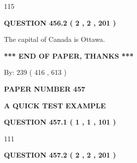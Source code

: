 \documentclass[12pt]{article}
\begin{document}
115
 
 
  
\vspace{0.2in}
  
{\textbf{\Large{QUESTION
456.2 
 ( 2 , 2 , 201 )
}}}
  
  
 
 
\noindent{}
 
 
The capital of Canada is Ottawa.
 
 
 
 
   
   
 \vspace{0.2in}
 
   
   
   
   
\vspace{1.0in} 
{\textbf{\large{ *** END OF PAPER, THANKS *** }}} 
   
   
\hspace{1.0in} By: 
 239 ( 416 ,  613 )
   
   
   
   
\newpage 
\setcounter{page}{ 
   457001 } 
   
   
   
   
 {\textbf{ \Large{ PAPER NUMBER  457  }}}
   
   
\vspace{0.2in}
   
   
   
   
   
   
 \vspace{0.2in}
{\LARGE {\textbf{ A QUICK TEST EXAMPLE}}}
   
   
  
\vspace{0.2in}
  
{\textbf{\Large{QUESTION
457.1 
 ( 1 , 1 , 101 )
}}}
  
  
 
 
\noindent{}

111
 
 
  
\vspace{0.2in}
  
{\textbf{\Large{QUESTION
457.2 
 ( 2 , 2 , 201 )
}}}
  
\end{document}
